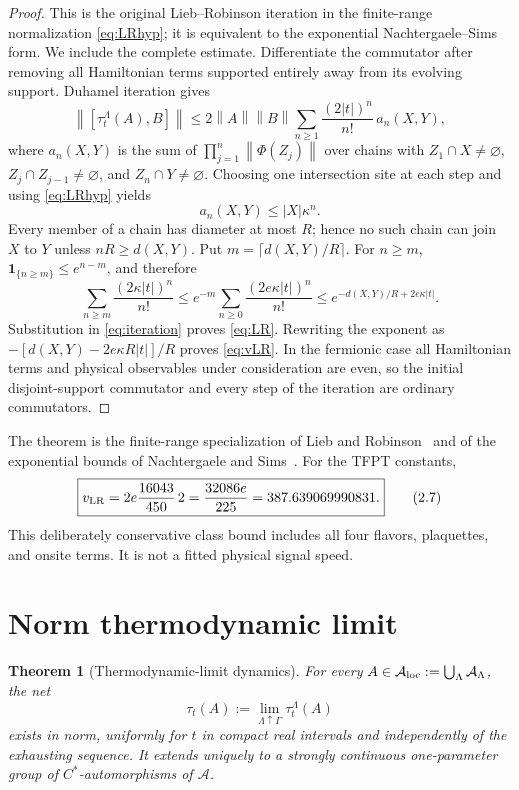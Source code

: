 \documentclass[11pt]{article}
\newtheorem{theorem}{Theorem}[section]
\theoremstyle{remark}
\newcommand{\A}{\mathcal A}
\newcommand{\norm}[1]{\left\lVert#1\right\rVert}
\begin{document}
\begin{proof}
This is the original Lieb--Robinson iteration in the finite-range
normalization \eqref{eq:LRhyp}; it is equivalent to the exponential
Nachtergaele--Sims form.  We include the complete estimate.
Differentiate the commutator after removing all Hamiltonian terms supported
entirely away from its evolving support.  Duhamel iteration gives
\[
 \norm{[\tau_t^\Lambda(A),B]}
 \leq2\norm A\norm B
 \sum_{n\geq1}\frac{(2|t|)^n}{n!}\,a_n(X,Y),
\tag{2.4}\label{eq:iteration}
\]
where \(a_n(X,Y)\) is the sum of
\(\prod_{j=1}^n\norm{\Phi(Z_j)}\) over chains with
\(Z_1\cap X\ne\varnothing\), \(Z_j\cap Z_{j-1}\ne\varnothing\), and
\(Z_n\cap Y\ne\varnothing\).  Choosing one intersection site at each
step and using \eqref{eq:LRhyp} yields
\[
 a_n(X,Y)\leq |X|\kappa^n.
\tag{2.5}\label{eq:pathweight}
\]
Every member of a chain has diameter at most \(R\); hence no such chain can
join \(X\) to \(Y\) unless \(nR\geq d(X,Y)\).  Put
\(m=\lceil d(X,Y)/R\rceil\).  For \(n\geq m\),
\(\mathbf1_{\{n\geq m\}}\leq e^{n-m}\), and therefore
\[
 \sum_{n\geq m}\frac{(2\kappa|t|)^n}{n!}
 \leq e^{-m}\sum_{n\geq0}\frac{(2e\kappa|t|)^n}{n!}
 \leq
 e^{-d(X,Y)/R+2e\kappa|t|}.
\tag{2.6}\label{eq:poissontail}
\]
Substitution in \eqref{eq:iteration} proves \eqref{eq:LR}.  Rewriting
the exponent as
\(-[d(X,Y)-2e\kappa R|t|]/R\) proves \eqref{eq:vLR}.  In the fermionic
case all Hamiltonian terms and physical observables under consideration
are even, so the initial disjoint-support commutator and every step of the
iteration are ordinary commutators.
\end{proof}

The theorem is the finite-range specialization of Lieb and
Robinson~\cite{LR1972} and of the exponential bounds of
Nachtergaele and Sims~\cite{NS2006,NS2010}.  For the TFPT constants,
\[
 \boxed{
 v_{\rm LR}=2e\frac{16043}{450}\,2
 =\frac{32086e}{225}
 =387.639069990831.}
\tag{2.7}\label{eq:TFPTvelocity}
\]
This deliberately conservative class bound includes all four flavors,
plaquettes, and onsite terms.  It is not a fitted physical signal speed.

\section{Norm thermodynamic limit}

\begin{theorem}[Thermodynamic-limit dynamics]
\label{thm:dynamics}
For every \(A\in\A_{\rm loc}:=\bigcup_{\Lambda}\A_\Lambda\), the net
\[
 \tau_t(A):=\lim_{\Lambda\uparrow\Gamma}\tau_t^\Lambda(A)
\tag{3.1}\label{eq:limit}
\]
exists in norm, uniformly for \(t\) in compact real intervals and
independently of the exhausting sequence.  It extends uniquely to a
strongly continuous one-parameter group of \(C^*\)-automorphisms of
\(\A\).
\end{theorem}
\end{document}
